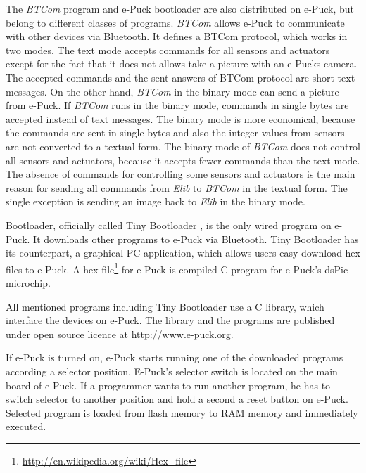   The {\it BTCom} program and e-Puck bootloader are also distributed on e-Puck, but belong to different classes of programs. 
  {\it BTCom} allows e-Puck to communicate with other devices via Bluetooth.
  It defines a BTCom protocol, which works in two modes. The text mode accepts commands for
  all sensors and actuators except for the fact that it does not allows take a picture 
  with an e-Pucks camera. 
  The accepted commands and the sent answers of BTCom protocol are short text messages.
  On the other hand, {\it BTCom} in the binary mode can send a picture from e-Puck.
  If {\it BTCom} runs in the binary mode, commands in single bytes are accepted instead of text messages.
  The binary mode is more economical, 
  because the commands are sent in single bytes and also the integer values from sensors
  are not converted to a textual form.
  The binary mode of {\it BTCom} does not control all sensors and actuators, because it accepts fewer commands than the text mode.
  The absence of commands for controlling some sensors and actuators is the main reason 
  for sending all commands from {\it Elib} to {\it BTCom} in the textual form. 
  The single exception is sending an image back to {\it Elib} in the binary mode.
   
  Bootloader, officially called Tiny Bootloader\cite{tiny}
  , is the only wired program on e-Puck. It downloads	other programs to e-Puck via Bluetooth. 
  Tiny Bootloader has its counterpart, a graphical PC application,
  which allows users easy download hex files to e-Puck.
  A hex file\footnote{\small{\url{http://en.wikipedia.org/wiki/Hex_file}}} 
  for e-Puck is compiled C program for e-Puck's dsPic microchip. 
   
  All mentioned programs including Tiny Bootloader use a C library, which interface the devices on e-Puck. 
  The library and the programs are published under open source licence at
  \url{http://www.e-puck.org}.

   
  If e-Puck is turned on, e-Puck starts running one of the downloaded programs according a selector 
  position. E-Puck's selector switch is located on the main board of e-Puck.
  If a programmer wants to run another program, he has to switch selector to another position
  and hold a second a reset button on e-Puck.	Selected program is loaded from flash memory
  to RAM memory and immediately executed.	
   
